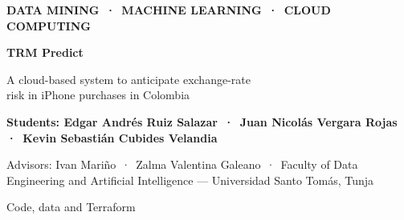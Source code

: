 \documentclass{article}
\newcommand{\body}{\fontsize{22}{29}\selectfont}
\begin{document}
\pagecolor{paper}


\vspace*{16mm}
\noindent\hspace*{24mm}\begin{minipage}[t]{546mm}
\begin{minipage}[t]{440mm}
  {\fontsize{24}{28}\selectfont\color{amber}\bfseries DATA MINING \,·\, MACHINE LEARNING \,·\, CLOUD COMPUTING\par}
  \vspace{6mm}
  {\fontsize{84}{90}\selectfont\bfseries\color{white}TRM Predict\par}
  \vspace{3mm}
  {\fontsize{38}{46}\selectfont\color{white}A cloud-based system to anticipate exchange-rate\\ risk in iPhone purchases in Colombia\par}
  \vspace{7mm}
  {\fontsize{24}{30}\selectfont\color{white}\bfseries Students: Edgar Andrés Ruiz Salazar \,·\, Juan Nicolás Vergara Rojas \,·\, Kevin Sebastián Cubides Velandia\par}
  \vspace{1mm}
  {\fontsize{21}{27}\selectfont\color{white!80!navy}Advisors: Ivan Mariño \,·\, Zalma Valentina Galeano \,·\, Faculty of Data Engineering and Artificial Intelligence --- Universidad Santo Tomás, Tunja\par}
\end{minipage}%
\hfill
\begin{minipage}[t]{90mm}\centering
  \vspace{4mm}
  \colorbox{white}{}\par
  \vspace{3mm}
  {\fontsize{18}{22}\selectfont\color{white}Code, data and Terraform\par}
\end{minipage}

\vspace{22mm}
\begin{minipage}[t]{174mm}\body


\end{minipage}
\end{minipage}
\end{document}
